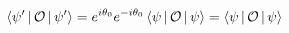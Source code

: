 \documentclass[preview]{standalone}
\begin{document}
\begin{align*}
\Braket{\psi '|\mathcal{O}|\psi '} = e^{i \theta_0}e^{-i \theta_0}\Braket{\psi  |\mathcal{O}|\psi } = \Braket{\psi|\mathcal{O}|\psi}
\end{align*}
\end{document}
